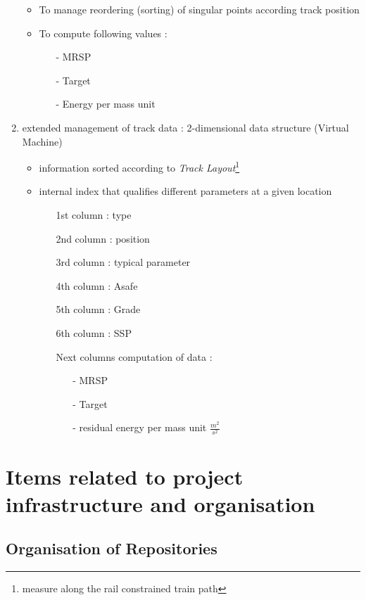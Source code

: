 \documentclass{template/openetcs_report}
\begin{document}
\begin{enumerate}
\begin{itemize}
\item To manage reordering (sorting) of  singular points according track position
\item To compute following values :
\begin{itemize}
\item[-]MRSP
\item[-]Target
\item[-]Energy per mass unit
\end{itemize}
\end{itemize}

\item  extended management of track data : 2-dimensional data structure (Virtual Machine)
\begin{itemize}
\item information sorted according to \emph{Track Layout}\footnote{measure along the rail constrained train path }
\item internal index that qualifies different parameters at a given location
\begin{itemize}
\item[1st column] : type
\item[2nd column] : position
\item[3rd column] : typical parameter
\item[4th column] : Asafe
\item[5th column] : Grade
\item[6th column] : SSP
\item[Next columns] computation of data :
\begin{itemize}
\item[-] MRSP
\item[-] Target
\item[-] residual energy per mass unit $\frac{m^2}{s^2}$
\end{itemize}
\end{itemize}
\end{itemize}
\end{enumerate}



\chapter{Items related to project infrastructure and organisation}
\section{Organisation of Repositories}
\end{document}
